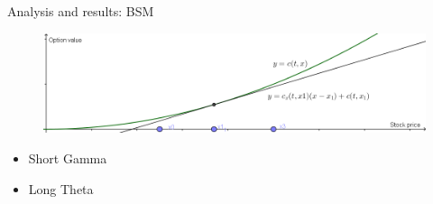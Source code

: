 \documentclass{beamer}
\begin{document}
\begin{frame}{Analysis and results: BSM}

    \begin{block}{}
     \begin{figure}[h]
        \centering
        \includegraphics[width=1\textwidth]{../figures/test.png}
      \end{figure}
    \end{block}%
  
    \begin{block}{}
      \begin{itemize}
        \item Short Gamma
        \item Long Theta
      \end{itemize}
    \end{block}%
  
  

\end{frame}
\end{document}
